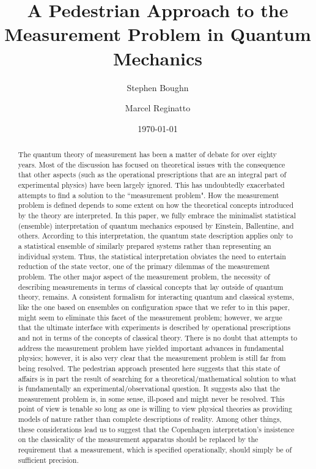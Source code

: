 \documentclass [12pt]{revtex4}
\begin{document}
\title{A Pedestrian Approach to the Measurement Problem in Quantum Mechanics}

\author{Stephen Boughn}


\author{Marcel Reginatto}
\address{Physikalisch-Technische Bundesanstalt, Braunschweig, Germany}

\date{\today}

\begin{abstract}

The quantum theory of measurement has been a matter of debate for
over eighty years. Most of the discussion has focused on theoretical
issues with the consequence that other aspects (such as the
operational prescriptions that are an integral part of experimental
physics) have been largely ignored. This has undoubtedly exacerbated
attempts to find a solution to the ``measurement problem". How the
measurement problem is defined depends to some extent on how the theoretical
concepts introduced by the theory are interpreted. In this paper, we
fully embrace the minimalist statistical (ensemble) interpretation
of quantum mechanics espoused by Einstein, Ballentine, and others.
According to this interpretation, the quantum state description
applies only to a statistical ensemble of similarly prepared systems
rather than representing an individual system. Thus, the statistical
interpretation obviates the need to entertain reduction of the state
vector, one of the primary dilemmas of the measurement problem. The
other major aspect of the measurement problem, the necessity of
describing measurements in terms of classical concepts that lay
outside of quantum theory, remains. A consistent formalism
for interacting quantum and classical systems, like the
one based on ensembles on configuration space that we
refer to in this paper, might seem to eliminate this facet of the
measurement problem; however, we argue that the ultimate interface
with experiments is described by operational prescriptions and not in terms of the concepts of classical theory. There is no doubt that attempts to address the measurement problem have
yielded important advances in fundamental physics;
however, it is also very clear that the measurement problem
is still far from being resolved.  The pedestrian approach presented here
suggests that this state of affairs is in part the result of searching for a
theoretical/mathematical solution to what is fundamentally an
experimental/observational question.  It suggests also that the measurement problem is, in some sense, ill-posed and
might never be resolved.  This point of view is tenable so long as one
is willing to view physical theories as providing models of nature
rather than complete descriptions of reality. Among other things,
these considerations lead us to suggest that the Copenhagen
interpretation's insistence on the classicality of the measurement
apparatus should be replaced by the requirement that a measurement,
which is specified operationally, should simply be of sufficient
precision.
\end{abstract}
\end{document}
